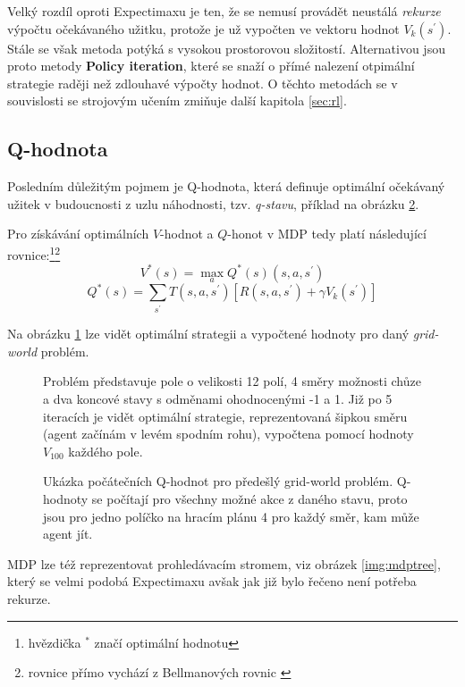 Velký rozdíl oproti Expectimaxu je ten, že se nemusí provádět neustálá \textit{rekurze} výpočtu očekávaného užitku, protože je už vypočten ve vektoru hodnot $V_k(s^\prime)$. Stále se však metoda potýká s vysokou prostorovou složitostí. Alternativou jsou proto metody \textbf{Policy iteration}, které se snaží o přímé nalezení otpimální strategie raději než zdlouhavé výpočty hodnot. O těchto metodách se v souvislosti se strojovým učením zmiňuje další kapitola \ref{sec:rl}.

\subsection{Q-hodnota}
Posledním důležitým pojmem je Q-hodnota, která definuje optimální očekávaný užitek v budoucnosti z uzlu náhodnosti, tzv. \textit{q-stavu}, příklad na obrázku \ref{img:qvals}.

Pro získávání optimálních $V$-hodnot a $Q$-honot  v MDP tedy platí následující rovnice:\footnote{hvězdička $^{*}$ značí optimální hodnotu}\footnote{rovnice přímo vychází z Bellmanových rovnic \cite{mas}}
\begin{displaymath}
V^*(s) = \max_a Q^*(s) (s,a,s^\prime)
\end{displaymath}
\begin{displaymath}
Q^*(s) = \sum_{s^\prime}T(s,a,s^\prime) \left[R(s,a,s^\prime)+\gamma V_k(s^\prime) \right]
\end{displaymath}

Na obrázku \ref{img:policy} lze vidět optimální strategii a vypočtené hodnoty pro daný \textit{grid-world} problém.

\begin{figure}[!htbp]
\begin{center}
	\caption{Problém představuje pole o velikosti 12 polí, 4 směry možnosti chůze a dva koncové stavy s odměnami ohodnocenými -1 a 1. Již po 5 iteracích je vidět optimální strategie, reprezentovaná šipkou směru (agent začínám v levém spodním rohu), vypočtena pomocí hodnoty $V_{100}$ každého pole.}
	\label{img:policy}
\end{center}
\end{figure}

\begin{figure}[!htbp]
\begin{center}
	\caption{Ukázka počátečních Q-hodnot pro předešlý grid-world problém. Q-hodnoty se počítají pro všechny možné akce z daného stavu, proto jsou pro jedno políčko na hracím plánu 4 pro každý směr, kam může agent jít.}
	\label{img:qvals}
\end{center}
\end{figure}
MDP lze též reprezentovat prohledávacím stromem, viz obrázek \ref{img:mdptree}, který se velmi podobá Expectimaxu avšak jak již bylo řečeno není potřeba rekurze.

